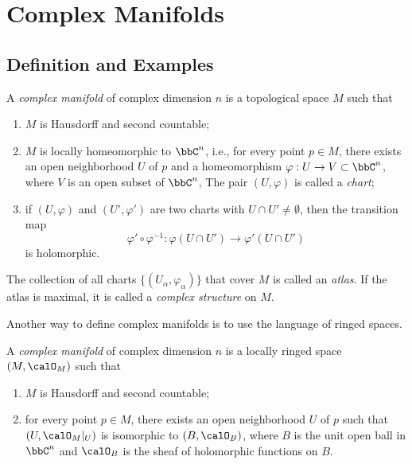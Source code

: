 \section{Complex Manifolds}

\subsection{Definition and Examples}

    \begin{definition}\label{def:complex_manifold}
        A \emph{complex manifold} of complex dimension \(n\) is a topological space \(M\) such that
        \begin{enumerate}
            \item \(M\) is Hausdorff and second countable;
            \item \(M\) is locally homeomorphic to \(\bbC^n\), i.e., for every point \(p\in M\), there exists an open neighborhood \(U\) of \(p\) and a homeomorphism \(\varphi: U\to V\subset \bbC^n\), where \(V\) is an open subset of \(\bbC^n\),
                The pair \((U,\varphi)\) is called a \emph{chart};
            \item if \((U,\varphi)\) and \((U',\varphi')\) are two charts with \(U\cap U'\neq \emptyset\), then the transition map
                \[
                    \varphi'\circ \varphi^{-1}: \varphi(U\cap U')\to \varphi'(U\cap U')
                \]
                is holomorphic.
        \end{enumerate}
        The collection of all charts \(\{(U_\alpha,\varphi_\alpha)\}\) that cover \(M\) is called an \emph{atlas}.
        If the atlas is maximal, it is called a \emph{complex structure} on \(M\).
    \end{definition}

    Another way to define complex manifolds is to use the language of ringed spaces.

    \begin{definition}\label{def:complex_manifold_as_ringed_space}
        A \emph{complex manifold} of complex dimension \(n\) is a locally ringed space \((M,\calO_M)\) such that
        \begin{enumerate}
            \item \(M\) is Hausdorff and second countable;
            \item for every point \(p\in M\), there exists an open neighborhood \(U\) of \(p\) such that \((U,\calO_M|_U)\) is isomorphic to \((B,\calO_B)\), where \(B\) is the unit open ball in \(\bbC^n\) and \(\calO_B\) is the sheaf of holomorphic functions on \(B\).
        \end{enumerate}
    \end{definition}

